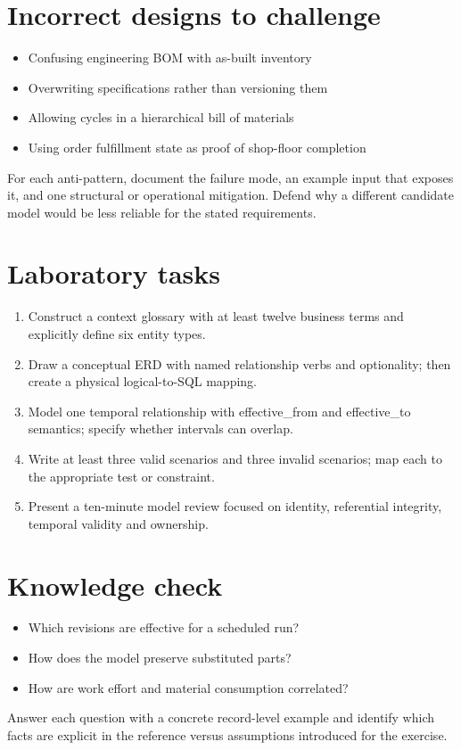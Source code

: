 \documentclass[11pt,letterpaper]{article}
\begin{document}
\section{Incorrect designs to challenge}
\begin{itemize}
\item Confusing engineering BOM with as-built inventory
\item Overwriting specifications rather than versioning them
\item Allowing cycles in a hierarchical bill of materials
\item Using order fulfillment state as proof of shop-floor completion
\end{itemize}
For each anti-pattern, document the failure mode, an example input that exposes it, and one structural or operational mitigation. Defend why a different candidate model would be less reliable for the stated requirements.


\section{Laboratory tasks}
\begin{enumerate}
\item Construct a context glossary with at least twelve business terms and explicitly define six entity types.
\item Draw a conceptual ERD with named relationship verbs and optionality; then create a physical logical-to-SQL mapping.
\item Model one temporal relationship with effective\_from and effective\_to semantics; specify whether intervals can overlap.
\item Write at least three valid scenarios and three invalid scenarios; map each to the appropriate test or constraint.
\item Present a ten-minute model review focused on identity, referential integrity, temporal validity and ownership.
\end{enumerate}

\section{Knowledge check}
\begin{itemize}
\item Which revisions are effective for a scheduled run?
\item How does the model preserve substituted parts?
\item How are work effort and material consumption correlated?
\end{itemize}
Answer each question with a concrete record-level example and identify which facts are explicit in the reference versus assumptions introduced for the exercise.
\end{document}
